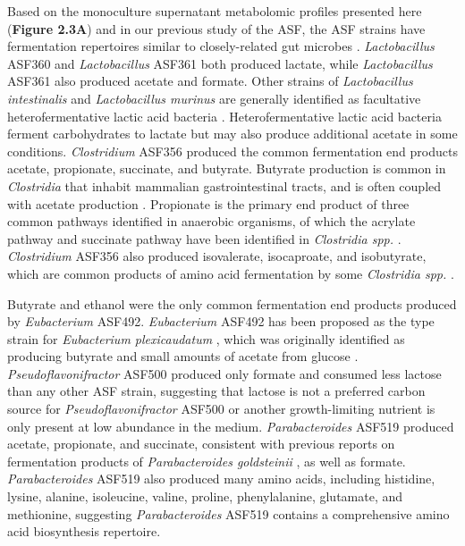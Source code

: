 \documentclass[11pt,onecolumn,notitlepage,openany,twoside]{book}
\begin{document}
\begin{refsection}
Based on the monoculture supernatant metabolomic profiles presented here (\textbf{Figure 2.3A}) and in our previous study of the ASF, the ASF strains have fermentation repertoires similar to closely-related gut microbes \cite{Biggs2017-fs}. \textit{Lactobacillus} ASF360 and \textit{Lactobacillus} ASF361 both produced lactate, while \textit{Lactobacillus} ASF361 also produced acetate and formate. Other strains of \textit{Lactobacillus intestinalis} and \textit{Lactobacillus murinus} are generally identified as facultative heterofermentative lactic acid bacteria \cite{Vos2011-bf}. Heterofermentative lactic acid bacteria ferment carbohydrates to lactate but may also produce additional acetate in some conditions. \textit{Clostridium} ASF356 produced the common fermentation end products acetate, propionate, succinate, and butyrate. Butyrate production is common in \textit{Clostridia} that inhabit mammalian gastrointestinal tracts, and is often coupled with acetate production \cite{Louis2009-ax}. Propionate is the primary end product of three common pathways identified in anaerobic organisms, of which the acrylate pathway and succinate pathway have been identified in \textit{Clostridia spp.} \cite{Reichardt2014-ua}. \textit{Clostridium} ASF356 also produced isovalerate, isocaproate, and isobutyrate, which are common products of amino acid fermentation by some \textit{Clostridia spp.} \cite{Mead1971-oa}.

Butyrate and ethanol were the only common fermentation end products produced by \textit{Eubacterium} ASF492. \textit{Eubacterium} ASF492 has been proposed as the type strain for \textit{Eubacterium plexicaudatum} \cite{Dewhirst1999-pp}, which was originally identified as producing butyrate and small amounts of acetate from glucose \cite{Wilkins1974-yn}. \textit{Pseudoflavonifractor} ASF500 produced only formate and consumed less lactose than any other ASF strain, suggesting that lactose is not a preferred carbon source for \textit{Pseudoflavonifractor} ASF500 or another growth-limiting nutrient is only present at low abundance in the medium. \textit{Parabacteroides} ASF519 produced acetate, propionate, and succinate, consistent with previous reports on fermentation products of \textit{Parabacteroides goldsteinii} \cite{Song2005-mt}, as well as formate. \textit{Parabacteroides} ASF519 also produced many amino acids, including histidine, lysine, alanine, isoleucine, valine, proline, phenylalanine, glutamate, and methionine, suggesting \textit{Parabacteroides} ASF519 contains a comprehensive amino acid biosynthesis repertoire.


\end{refsection}
\end{document}
